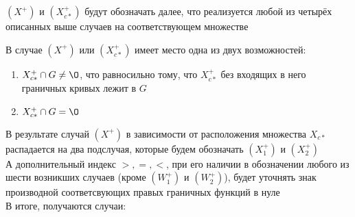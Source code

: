 \begin{notation}
    $ (X^+) $ и $ (X_{c*}^+) $ будут обозначать далее, что реализуется любой из четырёх описанных выше случаев на соответствующем множестве
\end{notation}

В случае $ (X^+) $ или $ (X_{c*}^+) $ имеет место одна из двух возможностей:
\begin{enumerate}
    \item $ X_{c*}^+ \cap G \ne \O $, что равносильно тому, что $ X_{c*}^+ $ без входящих в него граничных кривых лежит в $ G $
    \item $ X_{c*}^+ \cap G = \O $
\end{enumerate}

В результате случай $ (X^+) $ в зависимости от расположения множества $ X_{c*} $ распадается на два подслучая, которые будем обозначать $ (X_1^+) $ и $ (X_2^+) $ \\
А дополнительный индекс $ >, =, < $, при его наличии в обозначении любого из шести возникших случаев (кроме $ (W_1^+) $ и $ (W_2^+) $), будет уточнять знак производной соответсвующих правых граничных функций в нуле \\
В итоге, получаются случаи:
